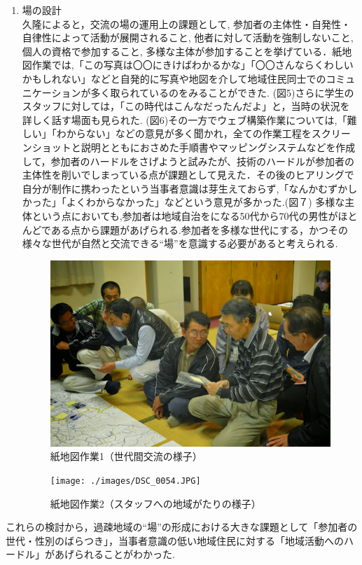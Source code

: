 \documentclass[a4paper]{jsarticle}
\begin{document}
\begin{enumerate}
\item 場の設計\\
久隆によると，交流の場の運用上の課題として, 参加者の主体性・自発性・自律性によって活動が展開されること, 他者に対して活動を強制しないこと, 個人の資格で参加すること, 多様な主体が参加することを挙げている．\cite{16}紙地図作業では,「この写真は〇〇にきけばわかるかな」「〇〇さんならくわしいかもしれない」などと自発的に写真や地図を介して地域住民同士でのコミュニケーションが多く取られているのをみることができた. (図5)さらに学生のスタッフに対しては，「この時代はこんなだったんだよ」と，当時の状況を詳しく話す場面も見られた. (図6)その一方でウェブ構築作業については,「難しい」「わからない」などの意見が多く聞かれ，全ての作業工程をスクリーンショットと説明とともにおさめた手順書やマッピングシステムなどを作成して，参加者のハードルをさげようと試みたが、技術のハードルが参加者の主体性を削いでしまっている点が課題として見えた．その後のヒアリングで自分が制作に携わったという当事者意識は芽生えておらず,「なんかむずかしかった」「よくわからなかった」などという意見が多かった.(図７)
多様な主体という点においても,参加者は地域自治をになる50代から70代の男性がほとんどである点から課題があげられる.参加者を多様な世代にする，かつその様々な世代が自然と交流できる“場”を意識する必要があると考えられる.\par

\begin{figure}[H]
  \begin{center}
    \includegraphics[width=0.95\hsize]{./images/komenoma-2.png}
    \caption{紙地図作業1（世代間交流の様子）}
    \label{fig:tmu_hino}
  \end{center}
\end{figure}
\begin{figure}[H]
  \begin{center}
    \texttt{[image: ./images/DSC\_0054.JPG]}
    \caption{紙地図作業2（スタッフへの地域がたりの様子）}
    \label{fig:tmu_hino}
  \end{center}
\end{figure}

\end{enumerate}
これらの検討から，過疎地域の“場”の形成における大きな課題として「参加者の世代・性別のばらつき」，当事者意識の低い地域住民に対する「地域活動へのハードル」があげられることがわかった.
\end{document}

